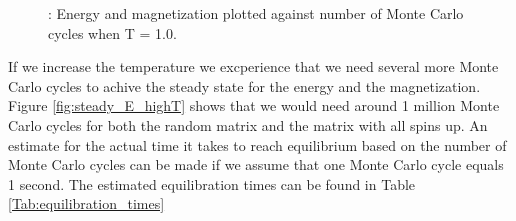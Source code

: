 \documentclass{article}
\begin{document}
{\begin{figure}
\caption{: Energy and magnetization plotted against number of Monte Carlo cycles when T = 1.0.}
\label{fig:steady_E}
\end{figure}

If we increase the temperature we excperience that we need several more Monte Carlo cycles to achive the steady state for the energy and the magnetization. Figure \ref{fig:steady_E_highT} shows that we would need around 1 million Monte Carlo cycles for both the random matrix and the matrix with all spins up. An estimate for the actual time it takes to reach equilibrium based on the number of Monte Carlo cycles can be made if we assume that one Monte Carlo cycle equals 1 second. The estimated equilibration times can be found in Table \ref{Tab:equilibration_times}

}
\end{document}
